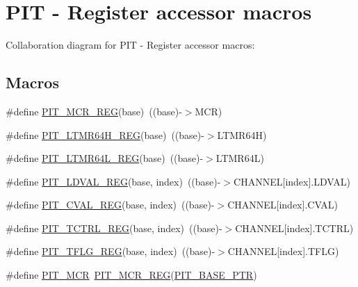 \hypertarget{group___p_i_t___register___accessor___macros}{}\section{P\+IT -\/ Register accessor macros}
\label{group___p_i_t___register___accessor___macros}
Collaboration diagram for P\+IT -\/ Register accessor macros\+:
\subsection*{Macros}
\begin{DoxyCompactItemize}
\item 
\#define \hyperlink{group___p_i_t___register___accessor___macros_ga01f1ee5f7f451b1f6f7f1b3549c63303}{P\+I\+T\+\_\+\+M\+C\+R\+\_\+\+R\+EG}(base)~((base)-\/$>$M\+CR)
\item 
\#define \hyperlink{group___p_i_t___register___accessor___macros_ga374ce53fa45b4b86f5245c6c49adf73b}{P\+I\+T\+\_\+\+L\+T\+M\+R64\+H\+\_\+\+R\+EG}(base)~((base)-\/$>$L\+T\+M\+R64H)
\item 
\#define \hyperlink{group___p_i_t___register___accessor___macros_ga992193153e2d2e13ea243b0045d20528}{P\+I\+T\+\_\+\+L\+T\+M\+R64\+L\+\_\+\+R\+EG}(base)~((base)-\/$>$L\+T\+M\+R64L)
\item 
\#define \hyperlink{group___p_i_t___register___accessor___macros_gaa1c49ea81e45e7ae3407b2b804432381}{P\+I\+T\+\_\+\+L\+D\+V\+A\+L\+\_\+\+R\+EG}(base,  index)~((base)-\/$>$C\+H\+A\+N\+N\+EL\mbox{[}index\mbox{]}.L\+D\+V\+AL)
\item 
\#define \hyperlink{group___p_i_t___register___accessor___macros_gaac9edbb5229fcbcd8d71f5fdeab96590}{P\+I\+T\+\_\+\+C\+V\+A\+L\+\_\+\+R\+EG}(base,  index)~((base)-\/$>$C\+H\+A\+N\+N\+EL\mbox{[}index\mbox{]}.C\+V\+AL)
\item 
\#define \hyperlink{group___p_i_t___register___accessor___macros_gaa338edf83b961108a6dcdd43c80ed8c6}{P\+I\+T\+\_\+\+T\+C\+T\+R\+L\+\_\+\+R\+EG}(base,  index)~((base)-\/$>$C\+H\+A\+N\+N\+EL\mbox{[}index\mbox{]}.T\+C\+T\+RL)
\item 
\#define \hyperlink{group___p_i_t___register___accessor___macros_gae38fd2f9c8baca1504582bc5f3973932}{P\+I\+T\+\_\+\+T\+F\+L\+G\+\_\+\+R\+EG}(base,  index)~((base)-\/$>$C\+H\+A\+N\+N\+EL\mbox{[}index\mbox{]}.T\+F\+LG)
\item 
\#define \hyperlink{group___p_i_t___register___accessor___macros_gad6118acee6a1de4d21ceaae97156642b}{P\+I\+T\+\_\+\+M\+CR}~\hyperlink{group___p_i_t___register___accessor___macros_ga01f1ee5f7f451b1f6f7f1b3549c63303}{P\+I\+T\+\_\+\+M\+C\+R\+\_\+\+R\+EG}(\hyperlink{group___p_i_t___peripheral_ga70be45f58402a8e6d2ce4df7b23aa41c}{P\+I\+T\+\_\+\+B\+A\+S\+E\+\_\+\+P\+TR})

\end{DoxyCompactItemize}
